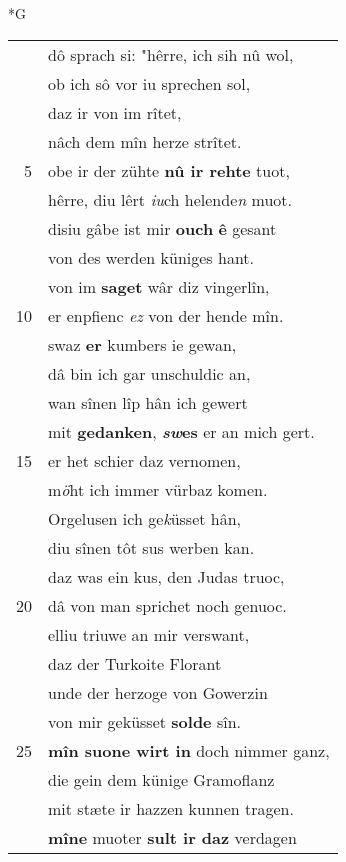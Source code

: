 \documentclass[8pt,a4paper,notitlepage]{article}
\begin{document}
\begin{table}[ht]
\begin{minipage}[t]{0.5\linewidth}
\small
\begin{center}*G
\end{center}
\begin{tabular}{rl}
 & dô sprach si: "hêrre, ich sih nû wol,\\ 
 & ob ich sô vor iu sprechen sol,\\ 
 & daz ir von im rîtet,\\ 
 & nâch dem mîn herze strîtet.\\ 
5 & obe ir der zühte \textbf{nû ir rehte} tuot,\\ 
 & hêrre, diu lêrt \textit{iu}ch helende\textit{n} muot.\\ 
 & disiu gâbe ist mir \textbf{ouch} \textbf{ê} gesant\\ 
 & von des werden küniges hant.\\ 
 & von im \textbf{saget} wâr diz vingerlîn,\\ 
10 & er enpfienc \textit{ez} von der hende mîn.\\ 
 & swaz \textbf{er} kumbers ie gewan,\\ 
 & dâ bin ich gar unschuldic an,\\ 
 & wan sînen lîp hân ich gewert\\ 
 & mit \textbf{gedanken}, \textbf{\textit{sw}es} er an mich gert.\\ 
15 & er het schier daz vernomen,\\ 
 & m\textit{ö}ht ich immer vürbaz komen.\\ 
 & Orgelusen ich ge\textit{k}üsset hân,\\ 
 & diu sînen tôt sus werben kan.\\ 
 & daz was ein kus, den Judas truoc,\\ 
20 & dâ von man sprichet noch genuoc.\\ 
 & elliu triuwe an mir verswant,\\ 
 & daz der Turkoite Florant\\ 
 & unde der herzoge von Gowerzin\\ 
 & von mir geküsset \textbf{solde} sîn.\\ 
25 & \textbf{mîn suone wirt in} doch nimmer ganz,\\ 
 & die gein dem künige Gramoflanz\\ 
 & mit stæte ir hazzen kunnen tragen.\\ 
 & \textbf{mîne} muoter \textbf{sult ir daz} verdagen\\ 

\end{tabular}
\end{minipage}
\end{table}
\end{document}
